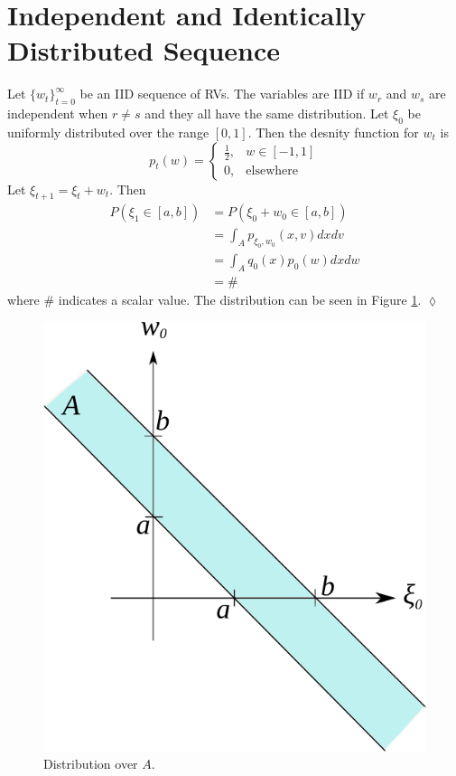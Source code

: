 \section{Independent and Identically Distributed Sequence}
\begin{example}
Let $\lbrace w_t\rbrace_{t=0}^\infty$ be an IID sequence of RVs. The variables are IID if $w_r$ and $w_s$ are independent when $r\neq s$ and they all have the same distribution. Let $\xi_0$ be uniformly distributed over the range $[0,1]$. Then the desnity function for $w_t$ is
$$p_t(w) = \begin{cases} \frac{1}{2}, & w\in[-1,1] \\ 0, & \text{elsewhere} \end{cases}$$
Let $\xi_{t+1}=\xi_t+w_t$. Then
\begin{align*}
P(\xi_1\in[a,b]) &= P(\xi_0 + w_0\in[a,b]) \\
&= \int_A p_{\xi_0,w_0}(x,v)dxdv \\
&= \int_A q_0(x)p_0(w)dxdw \\
&= \#
\end{align*}
where $\#$ indicates a scalar value. The distribution can be seen in Figure \ref{fig:02iid}.
$\lozenge$
\end{example}

\begin{figure}[ht!]
	\centering
	\includegraphics[width=.3\textwidth]{images/02iid}
	\caption{Distribution over $A$.}
	\label{fig:02iid}
\end{figure}

